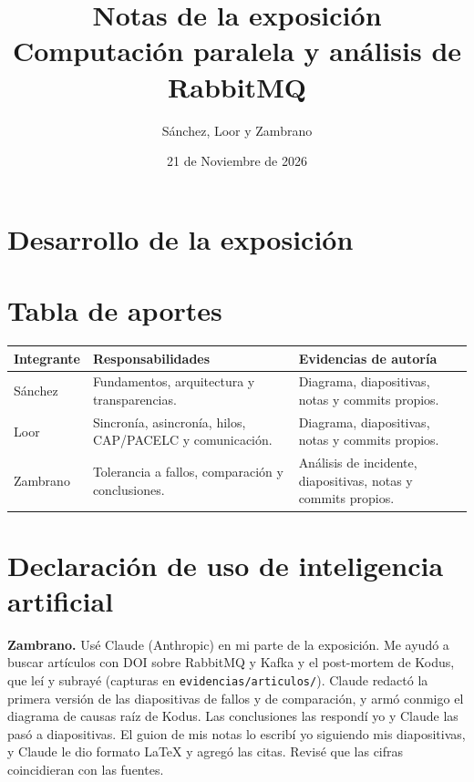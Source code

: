 \documentclass[11pt,a4paper]{article}
\title{Notas de la exposición\\
Computación paralela y análisis de RabbitMQ}
\author{Sánchez, Loor y Zambrano}
\date{21 de Noviembre de 2026}
\begin{document}
\maketitle

\section*{Desarrollo de la exposición}





\section*{Tabla de aportes}

\begin{table}[H]
\centering
\small
\begin{tabularx}{\textwidth}{@{}p{2cm}X X@{}}
\toprule
\textbf{Integrante} & \textbf{Responsabilidades} &
\textbf{Evidencias de autoría} \\
\midrule
Sánchez & Fundamentos, arquitectura y transparencias. &
Diagrama, diapositivas, notas y commits propios. \\

Loor & Sincronía, asincronía, hilos, CAP/PACELC y comunicación. &
Diagrama, diapositivas, notas y commits propios. \\

Zambrano & Tolerancia a fallos, comparación y conclusiones. &
Análisis de incidente, diapositivas, notas y commits propios. \\
\bottomrule
\end{tabularx}
\end{table}

\section*{Declaración de uso de inteligencia artificial}

\textbf{Zambrano.} Usé Claude (Anthropic) en mi parte de la exposición. Me
ayudó a buscar artículos con DOI sobre RabbitMQ y Kafka y el post-mortem de
Kodus, que leí y subrayé (capturas en \texttt{evidencias/articulos/}). Claude
redactó la primera versión de las diapositivas de fallos y de comparación, y
armó conmigo el diagrama de causas raíz de Kodus. Las conclusiones las
respondí yo y Claude las pasó a diapositivas. El guion de mis notas lo escribí
yo siguiendo mis diapositivas, y Claude le dio formato \LaTeX{} y agregó las
citas. Revisé que las cifras coincidieran con las fuentes.
\end{document}
